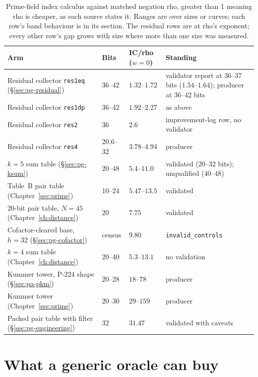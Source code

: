 \begin{table}[t]
\centering\small
\begin{tabularx}{\linewidth}{@{}Xlll@{}}
\toprule
Arm & Bits & IC/rho ($w=0$) & Standing \\
\midrule
Residual collector \texttt{res1eq} (\S\ref{sec:pg-residual}) & 36--42 & $1.32$--$1.72$ & validator report at 36--37 bits ($1.54$--$1.64$); producer at 36--42 bits \\
Residual collector \texttt{res1dp} & 36--42 & $1.92$--$2.27$ & as above \\
Residual collector \texttt{res2} & 36 & $2.6$ & improvement-log row, no validator \\
Residual collector \texttt{res4} & 20.6--32 & $3.78$--$4.94$ & producer \\
$k=5$ sum table (\S\ref{sec:pg-ksum}) & 20--48 & $5.4$--$11.0$ & validated (20--32 bits); unqualified (40--48) \\
Table~B pair table (Chapter~\ref{sec:prime}) & 10--24 & $5.47$--$13.5$ & validated \\
20-bit pair table, $N=45$ (Chapter~\ref{ch:distance}) & 20 & $7.75$ & validated \\
Cofactor-cleared base, $h=32$ (\S\ref{sec:pg-cofactor}) & census & $9.80$ & \texttt{invalid\_controls} \\
$k=4$ sum table (Chapter~\ref{ch:distance}) & 20--40 & $5.3$--$13.1$ & no validation \\
Kummer tower, P-224 shape (\S\ref{sec:pa-pkm}) & 20--28 & $18$--$78$ & producer \\
Kummer tower (Chapter~\ref{sec:prime}) & 20--30 & $29$--$159$ & producer \\
Packed pair table with filter (\S\ref{sec:pg-engineering}) & 32 & $31.47$ & validated with caveats \\
\bottomrule
\end{tabularx}
\caption[]{Prime-field index calculus against matched negation rho,
greater than 1 meaning rho is cheaper, as each source states it. Ranges are
over sizes or curves; each row's band behaviour is in its section. The
residual rows are at rho's exponent; every other row's gap grows with
size where more than one size was measured.}
\label{tab:pg-summary}
\end{table}

\section{What a generic oracle can buy}\label{sec:pg-gate}

